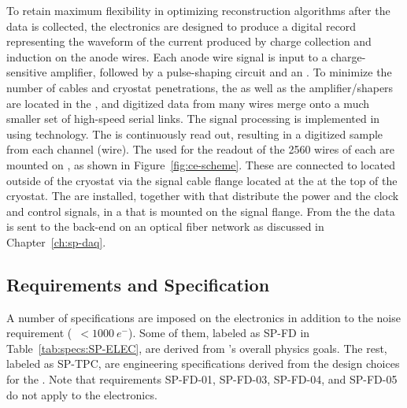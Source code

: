 To retain maximum flexibility in optimizing reconstruction algorithms after 
the  data is collected, the  electronics are designed 
to produce a digital record representing the waveform of the current produced 
by charge collection and induction on the anode wires. Each anode wire signal is 
input to a charge-sensitive amplifier, followed by a pulse-shaping circuit and 
an . To minimize the number of cables and cryostat penetrations, 
the  as well as the amplifier/shapers are located in the , 
and digitized data from many wires merge onto a much smaller set of high-speed 
serial links. The  signal processing is implemented in 
using  technology. The  is continuously read out, resulting 
in a digitized  sample from each  channel (wire). The 
 used for the readout of the \num{2560} wires of each  
are mounted on , as shown in Figure~\ref{fig:ce-scheme}. These are
connected to  located outside of the cryostat via the  signal 
cable flange located at the  \fdth at the top of the cryostat.
The  are installed, together with  that distribute
the power and the clock and control signals, in a  that is
mounted on the signal flange. From the  the data is sent to 
the  back-end on an optical fiber network as discussed in 
Chapter~\ref{ch:sp-daq}. 

\subsection{Requirements and Specification}
\label{sec:fdsp-tpcelec-overview-requirements}

A number of specifications are imposed on the  electronics in addition to the 
noise requirement (~$<\SI{1000}{e^-}$). Some of them, labeled as 
SP-FD in Table~\ref{tab:specs:SP-ELEC}, are derived from 's 
overall physics goals. The rest, labeled as SP-TPC, are engineering specifications 
derived from the design choices for the . Note that requirements 
SP-FD-01, SP-FD-03, SP-FD-04, and SP-FD-05 do not apply to the  electronics. 


\pagebreak


